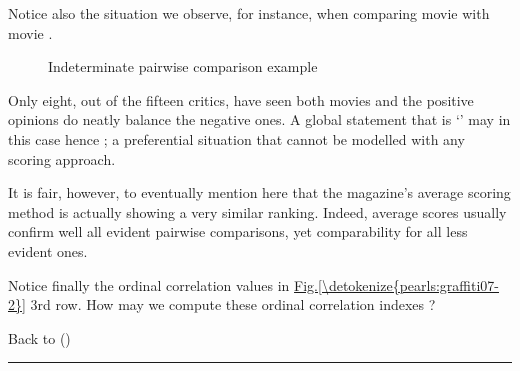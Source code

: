 \documentclass[a4paper,12pt,english]{sphinxhowto}
\let\sphinxpxdimen\pdfpxdimen\else\newdimen\sphinxpxdimen
\begin{document}
\sphinxAtStartPar
Notice also the  situation we observe, for instance, when comparing movie  with movie .

\begin{sphinxVerbatim}[commandchars=\\\{\}]
\end{sphinxVerbatim}

\begin{figure}[H]
\centering
\capstart

\noindent\sphinxincludegraphics[width=400\sphinxpxdimen]{{graffiti07_6}.png}
\caption{Indeterminate pairwise comparison example}\label{\detokenize{pearls:id132}}\end{figure}

\sphinxAtStartPar
Only eight, out of the fifteen critics, have seen both movies and the positive opinions do neatly balance the negative ones. A global statement that  is ‘’   may in this case hence ; a preferential situation that cannot be modelled with any scoring approach.

\sphinxAtStartPar
It is fair, however, to eventually mention here that the  magazine’s average scoring method is actually showing a very similar ranking. Indeed, average scores usually confirm well all evident pairwise comparisons, yet  comparability for all less evident ones.

\sphinxAtStartPar
Notice finally the ordinal correlation  values in
\hyperref[\detokenize{pearls:graffiti07-2}]{Fig.\@ \ref{\detokenize{pearls:graffiti07-2}}} 3rd row. How may we compute these ordinal correlation indexes ?

\sphinxAtStartPar
Back to {\hyperref[\detokenize{pearls:pearls-label}]{}} ()


\bigskip\hrule\bigskip
\end{document}
